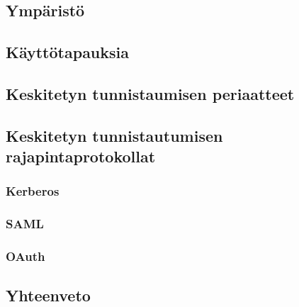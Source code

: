 \subsection{Ympäristö}

\subsection{Käyttötapauksia}

\subsection{Keskitetyn tunnistaumisen periaatteet}

\subsection{Keskitetyn tunnistautumisen rajapintaprotokollat}

\subsubsection{Kerberos}

\subsubsection{SAML}

\subsubsection{OAuth}

\subsection{Yhteenveto}

